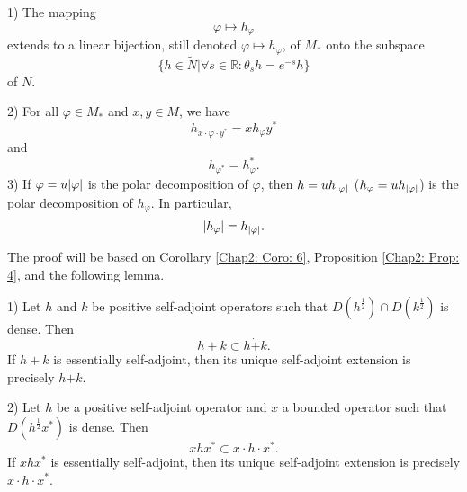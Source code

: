 \begin{theorem}\label{Chap2: Thm: 7}
    1) The mapping
    \[
        \varphi\mapsto h_\varphi
    \]
    extends to a linear bijection, still denoted $\varphi\mapsto h_\varphi$, of $M_*$ onto the subspace
    \begin{equation}\label{Chap2: eqn: 19}
        \{h\in \tilde{N}|\forall s\in \mathbb{R}:\theta_sh=e^{-s}h\}
    \end{equation}
    of $N$.\par
    2) For all $\varphi\in M_*$ and $x,y \in M$, we have
    \begin{equation}\label{Chap2: eqn: 20}
        h_{x\cdot \varphi \cdot y^*}=x h_\varphi y^*
    \end{equation}
    and
    \begin{equation}\label{Chap2: eqn: 21}
        h_{\varphi^*}=h_\varphi^*.
    \end{equation}
    3) If $\varphi=u\abs{\varphi}$ is the polar decomposition of $\varphi$, then $h=uh_{\abs{\varphi}}$ {\color{red} ($h_\varphi=uh_{\abs{\varphi}}$)} is the polar decomposition of $h_\varphi$. In particular,
    \begin{equation}
        \abs{h_\varphi}=h_{\abs{\varphi}}.
    \end{equation}
\end{theorem}
The proof will be based on Corollary \ref{Chap2: Coro: 6}, Proposition \ref{Chap2: Prop: 4}, and the following lemma.
\begin{lemma}\label{Chap2: lemma: 8}
    1) Let $h$ and $k$ be positive self-adjoint operators such that $D(h^\frac{1}{2})\cap D(k^\frac{1}{2})$ is dense. Then
    \[
        h+k\subset h\dot{+}k.
    \]
    If $h+k$ is essentially self-adjoint, then its unique self-adjoint extension is precisely $h\dot{+}k$.\par
    2) Let $h$ be a positive self-adjoint operator and $x$ a bounded operator such that $D(h^\frac{1}{2}x^*)$ is dense. Then
    \[
        xhx^*\subset x\cdot h\cdot x^*.
    \]
    If $xhx^*$ is essentially self-adjoint, then its unique self-adjoint extension is precisely $x\cdot h\cdot x^*$.
\end{lemma}
